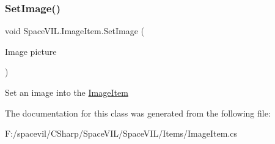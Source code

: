 \mbox{\label{class_space_v_i_l_1_1_image_item_ae62563d3131e913b37293731fa535205}} 
\subsubsection{\texorpdfstring{Set\+Image()}{SetImage()}}
{\footnotesize\ttfamily void Space\+V\+I\+L.\+Image\+Item.\+Set\+Image (\begin{DoxyParamCaption}\item[{Image}]{picture }\end{DoxyParamCaption})\hspace{0.3cm}{\ttfamily [inline]}}



Set an image into the \mbox{\hyperlink{class_space_v_i_l_1_1_image_item}{Image\+Item}} 



The documentation for this class was generated from the following file\+:\begin{DoxyCompactItemize}
\item 
F\+:/spacevil/\+C\+Sharp/\+Space\+V\+I\+L/\+Space\+V\+I\+L/\+Items/Image\+Item.\+cs\end{DoxyCompactItemize}
